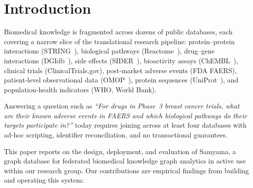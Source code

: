 \documentclass[runningheads]{llncs}
\begin{document}
\section{Introduction}\label{sec:intro}

Biomedical knowledge is fragmented across dozens of public databases,
each covering a narrow slice of the translational research pipeline:
protein--protein interactions (STRING~\cite{szklarczyk2023string}),
biological pathways (Reactome~\cite{gillespie2022reactome}), drug--gene
interactions (DGIdb~\cite{freshour2021dgidb}), side effects
(SIDER~\cite{kuhn2016sider}), bioactivity assays
(ChEMBL~\cite{zdrazil2024chembl}), clinical trials
(ClinicalTrials.gov), post-market adverse events
(FDA FAERS), patient-level observational data (OMOP~\cite{hripcsak2015omop}),
protein sequences (UniProt~\cite{uniprot2023}), and
population-health indicators (WHO, World Bank).

Answering a question such as \emph{``For drugs in Phase~3 breast cancer
trials, what are their known adverse events in FAERS and which
biological pathways do their targets participate in?''} today requires
joining across at least four databases with ad-hoc scripting,
identifier reconciliation, and no transactional guarantees.

This paper reports on the design, deployment, and evaluation of
Samyama, a graph database for federated biomedical knowledge graph
analytics in active use within our research group.  Our
contributions are empirical findings from building and operating
this system:
\end{document}
